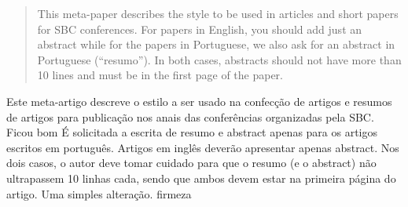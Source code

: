 \begin{abstract}
    This meta-paper describes the style to be used in articles and short papers
    for SBC conferences. For papers in English, you should add just an abstract
    while for the papers in Portuguese, we also ask for an abstract in
    Portuguese (``resumo''). In both cases, abstracts should not have more than
    10 lines and must be in the first page of the paper.
  \end{abstract}
       
  \begin{resumo} 
    Este meta-artigo descreve o estilo a ser usado na confecção de artigos e
    resumos de artigos para publicação nos anais das conferências organizadas
    pela SBC. Ficou bom É solicitada a escrita de resumo e abstract apenas para os artigos
    escritos em português. Artigos em inglês deverão apresentar apenas abstract.
    Nos dois casos, o autor deve tomar cuidado para que o resumo (e o abstract)
    não ultrapassem 10 linhas cada, sendo que ambos devem estar na primeira página do artigo. Uma simples alteração. firmeza
  \end{resumo}
